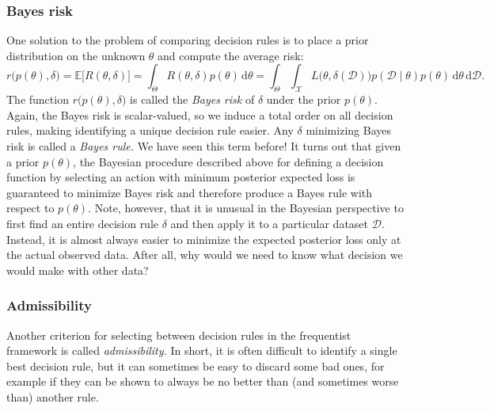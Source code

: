 \documentclass{article}
\newcommand{\given}{\mid}
\newcommand{\mc}[1]{\mathcal{#1}}
\newcommand{\data}{\mc{D}}
\newcommand{\intd}[1]{\,\mathrm{d}{#1}}
\begin{document}
\subsubsection*{Bayes risk}

One solution to the problem of comparing decision rules is to place a
prior distribution on the unknown $\theta$ and compute the average
risk:
\begin{equation*}
  r\bigl(p(\theta), \delta\bigr)
  =
  \mathbb{E}\bigl[R(\theta, \delta)\bigr]
  =
  \int_{\Theta}
  R(\theta, \delta)
  p(\theta)
  \intd{\theta}
  =
  \int_{\Theta}
  \int_{\mc{X}}
  L\bigl(\theta, \delta(\data)\bigr)
  p(\data \given \theta)
  p(\theta)
  \intd{\theta}
  \intd{\data}.
\end{equation*}
The function $r\bigl(p(\theta), \delta\bigr)$ is called the
\emph{Bayes risk} of $\delta$ under the prior $p(\theta)$.  Again, the
Bayes risk is scalar-valued, so we induce a total order on all
decision rules, making identifying a unique decision rule easier.  Any
$\delta$ minimizing Bayes risk is called a \emph{Bayes rule.}  We have
seen this term before!  It turns out that given a prior $p(\theta)$,
the Bayesian procedure described above for defining a decision
function by selecting an action with minimum posterior expected loss
is guaranteed to minimize Bayes risk and therefore produce a Bayes
rule with respect to $p(\theta)$.  Note, however, that it is unusual
in the Bayesian perspective to first find an entire decision rule
$\delta$ and then apply it to a particular dataset $\data$.  Instead,
it is almost always easier to minimize the expected posterior loss
only at the actual observed data.  After all, why would we need to know
what decision we would make with other data?

\subsubsection*{Admissibility}

Another criterion for selecting between decision rules in the
frequentist framework is called \emph{admissibility.}  In short, it is
often difficult to identify a single best decision rule, but it can
sometimes be easy to discard some bad ones, for example if they can be
shown to always be no better than (and sometimes worse than) another
rule.
\end{document}
